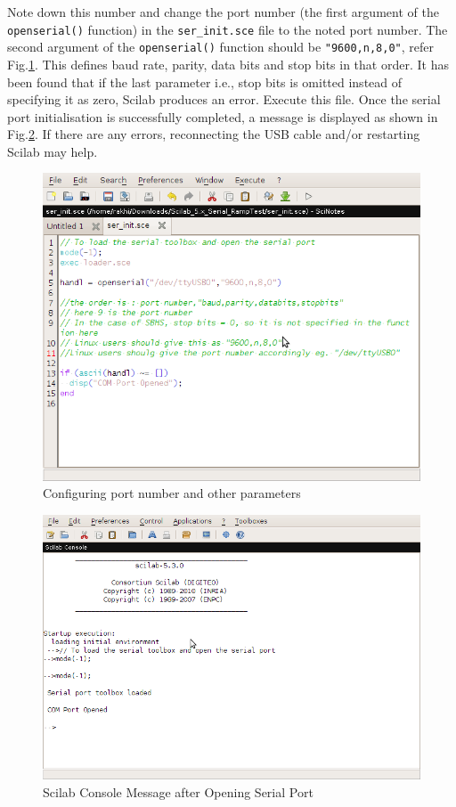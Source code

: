 Note down this number and change the port number (the first argument of the \\ {\tt openserial()} function) in the {\tt ser\_init.sce} file to the noted port number. The second argument of the {\tt openserial()} function should be {\tt "9600,n,8,0"}, refer Fig.\ref{linuxserial}. This defines baud rate, parity, data bits and stop bits in that order. It has been found that if the last parameter i.e., stop bits is omitted instead of specifying it as zero, Scilab produces an error. Execute this file. Once the serial port initialisation is successfully completed, a message is displayed as shown in Fig.\ref{console_linux}. If there are any errors, reconnecting the USB cable and/or restarting Scilab may help.
\begin{figure}
\centering
\includegraphics[width=\linewidth]{using-sbhs/linuxserial.png}
\caption{Configuring port number and other parameters}
\label{linuxserial}
\end{figure}


\begin{figure}
\centering
\includegraphics[width=0.7\linewidth]{using-sbhs/SSscilab.png}
\caption{Scilab Console Message after Opening Serial Port}
\label{console_linux}
\end{figure}

